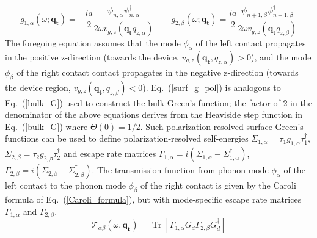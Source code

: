 \documentclass[11pt]{article}
\DeclareMathOperator{\Tr}{Tr}
\begin{document}
\begin{equation}
g_{1,\alpha}(\omega;\boldsymbol{q_{t}}) = -\frac{ia}{2}\frac{\psi_{n,\alpha}\psi_{n,\alpha}^\dagger}{2\omega v_{g,z}(\boldsymbol{q_{t}}q_{z,\alpha})} \qquad g_{2,\beta}(\omega;\boldsymbol{q_{t}}) = \frac{ia}{2}\frac{\psi_{n+1,\beta}\psi_{n+1,\beta}^\dagger}{2\omega v_{g,z}(\boldsymbol{q_{t}}q_{z,\beta})}
\label{surf_g_pol}
\end{equation}
The foregoing equation assumes that the mode $\phi_\alpha$ of the left contact propagates in the positive z-direction (towards the device, $v_{g,z}(\boldsymbol{q_{t}},q_{z,\alpha})>0$), and the mode $\phi_\beta$ of the right contact contact propagates in the negative z-direction (towards the device region, $v_{g,z}(\boldsymbol{q_{t}},q_{z,\beta})<0$). Eq.~(\ref{surf_g_pol}) is analogous to Eq.~(\ref{bulk_G}) used to construct the bulk Green's function; the factor of 2 in the denominator of the above equations derives from the Heaviside step function in Eq.~(\ref{bulk_G}) where $\Theta(0)=1/2$. Such polarization-resolved surface Green's functions can be used to define polarization-resolved self-energies $\Sigma_{1,\alpha} = \tau_1g_{1,\alpha}\tau_1^\dagger$, $\Sigma_{2,\beta} = \tau_2g_{2,\beta}\tau_2^\dagger$ and escape rate matrices $\Gamma_{1,\alpha} = i(\Sigma_{1,\alpha}-\Sigma_{1,\alpha}^\dagger)$, $\Gamma_{2,\beta} = i(\Sigma_{2,\beta}-\Sigma_{2,\beta}^\dagger)$. The transmission function from phonon mode $\phi_{\alpha}$ of the left contact to the phonon mode $\phi_{\beta}$ of the right contact is given by the Caroli formula of Eq.~(\ref{Caroli_formula}), but with mode-specific escape rate matrices $\Gamma_{1,\alpha}$ and $\Gamma_{2,\beta}$. 
\begin{equation}
\mathcal{T}_{\alpha\beta}(\omega,\boldsymbol{q_{t}}) = \Tr[\Gamma_{1,\alpha}G_d\Gamma_{2,\beta}G_d^\dagger]
\end{equation}
\end{document}
